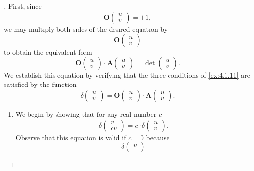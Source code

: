 \begin{proof}[]
  First, since
  \[
    \mathbf{O}\begin{pmatrix}
      u \\
      v
    \end{pmatrix} = \pm 1,
  \]
  we may multiply both sides of the desired equation by
  \[
    \mathbf{O}\begin{pmatrix}
      u \\
      v
    \end{pmatrix}
  \]
  to obtain the equivalent form
  \[
    \mathbf{O}\begin{pmatrix}
      u \\
      v
    \end{pmatrix} \cdot \mathbf{A}\begin{pmatrix}
      u \\
      v
    \end{pmatrix} = \det\begin{pmatrix}
      u \\
      v
    \end{pmatrix}.
  \]
  We establish this equation by verifying that the three conditions of \cref{ex:4.1.11} are satisfied by the function
  \[
    \delta\begin{pmatrix}
      u \\
      v
    \end{pmatrix} = \mathbf{O}\begin{pmatrix}
      u \\
      v
    \end{pmatrix} \cdot \mathbf{A}\begin{pmatrix}
      u \\
      v
    \end{pmatrix}.
  \]
  \begin{enumerate}
    \item We begin by showing that for any real number \(c\)
          \[
            \delta\begin{pmatrix}
              u \\
              cv
            \end{pmatrix} = c \cdot \delta\begin{pmatrix}
              u \\
              v
            \end{pmatrix}.
          \]
          Observe that this equation is valid if \(c = 0\) because
          \[
            \delta\begin{pmatrix}
              u \\

\end{pmatrix}\]
\end{enumerate}
\end{proof}
